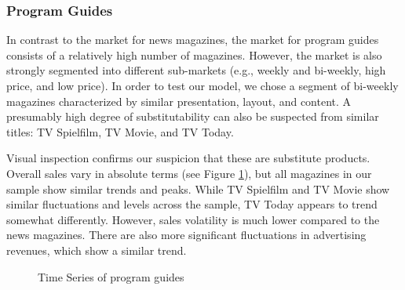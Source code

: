 \documentclass[12pt,a4paper,notitlepage]{article}
\begin{document}

\subsubsection{Program Guides}

In contrast to the market for news magazines, the market for program guides consists of a relatively high number of magazines. However, the market is also strongly segmented into different sub-markets (e.g., weekly and bi-weekly, high price, and low price). In order to test our model, we chose a segment of bi-weekly magazines characterized by similar presentation, layout, and content. A presumably high degree of substitutability can also be suspected from similar titles: TV Spielfilm, TV Movie, and TV Today.  

Visual inspection confirms our suspicion that these are substitute products. Overall sales vary in absolute terms (see Figure \ref{fig_tv}), but all magazines in our sample show similar trends and peaks. While TV Spielfilm and TV Movie show similar fluctuations and levels across the sample, TV Today appears to trend somewhat differently. However, sales volatility is much lower compared to the news magazines. There are also more significant fluctuations in advertising revenues, which show a similar trend.  


\begin{figure}[H]\centering
\caption{Time Series of program guides}
	\label{fig_tv}
\end{figure}
\end{document}
